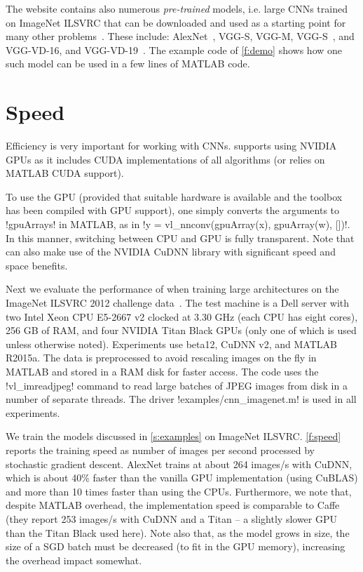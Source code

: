 The \matconvnet website contains also numerous \emph{pre-trained} models, i.e. large CNNs trained on ImageNet ILSVRC that can be downloaded and used as a starting point for many other problems~\cite{chatfield14return}. These include: AlexNet~\cite{krizhevsky12imagenet}, VGG-S, VGG-M,  VGG-S~\cite{chatfield14return}, and  VGG-VD-16, and VGG-VD-19~\cite{simonyan14very}.  The example code of \autoref{f:demo} shows how one such model can be used in a few lines of MATLAB code.

\section{Speed}\label{s:speed}

Efficiency is very important for working with CNNs. \matconvnet supports  using NVIDIA GPUs as it includes CUDA implementations of all algorithms (or relies on MATLAB CUDA support). 

 To use the GPU (provided that suitable hardware is available and the toolbox has been compiled with GPU support), one simply converts the arguments to !gpuArrays! in MATLAB, as in !y = vl_nnconv(gpuArray(x), gpuArray(w), [])!. In this manner, switching between CPU and GPU is fully transparent. Note that \matconvnet can also make use of the NVIDIA CuDNN library with significant speed and space benefits.
 
Next we evaluate the performance of \matconvnet when training large architectures on the ImageNet ILSVRC 2012 challenge data~\cite{deng09imagenet}. The test machine is a Dell server with two Intel Xeon CPU E5-2667 v2 clocked at 3.30 GHz (each CPU has eight cores), 256 GB of RAM, and four NVIDIA Titan Black GPUs (only one of which is used unless otherwise noted). Experiments use \matconvnet beta12, CuDNN v2, and MATLAB R2015a. The data is preprocessed to avoid rescaling images on the fly in MATLAB and stored in a RAM disk for faster access. The code uses the !vl_imreadjpeg! command to read large batches of JPEG images from disk in a number of separate threads. The driver !examples/cnn_imagenet.m! is used in all experiments.

 We train the models discussed in \autoref{s:examples} on ImageNet ILSVRC. \autoref{f:speed} reports the training speed as number of images per second processed by stochastic gradient descent. AlexNet trains at about 264 images/s with CuDNN, which is about 40\% faster than the vanilla GPU implementation (using CuBLAS) and more than 10 times faster than using the CPUs. Furthermore, we note that, despite MATLAB overhead, the implementation speed is comparable to Caffe (they report 253 images/s with CuDNN and a Titan -- a slightly slower GPU than the Titan Black used here).  Note also that, as the model grows in size, the size of a SGD batch must be decreased (to fit in the GPU memory), increasing the overhead impact somewhat.
 
